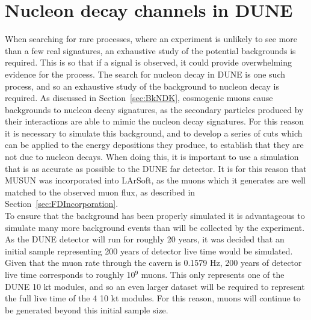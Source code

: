 \section{Nucleon decay channels in DUNE} \label{sec:DUNENDK} %
When searching for rare processes, where an experiment is unlikely to see more than a few real signatures, an exhaustive study of the potential backgrounds is required. This is so that if a signal is observed, it could provide overwhelming evidence for the process. The search for nucleon decay in DUNE is one such process, and so an exhaustive study of the background to nucleon decay is required. As discussed in Section~\ref{sec:BkNDK}, cosmogenic muons cause backgrounds to nucleon decay signatures, as the secondary particles produced by their interactions are able to mimic the nucleon decay signatures. For this reason it is necessary to simulate this background, and to develop a series of cuts which can be applied to the energy depositions they produce, to establish that they are not due to nucleon decays. When doing this, it is important to use a simulation that is as accurate as possible to the DUNE far detector. It is for this reason that MUSUN was incorporated into LArSoft, as the muons which it generates are well matched to the observed muon flux, as described in Section~\ref{sec:FDIncorporation}. \\

To ensure that the background has been properly simulated it is advantageous to simulate many more background events than will be collected by the experiment. As the DUNE detector will run for roughly 20 years, it was decided that an initial sample representing 200 years of detector live time would be simulated. Given that the muon rate through the cavern is 0.1579 Hz, 200 years of detector live time corresponds to roughly 10$^9$ muons. This only represents one of the DUNE 10 kt modules, and so an even larger dataset will be required to represent the full live time of the 4 10 kt modules. For this reason, muons will continue to be generated beyond this initial sample size. \\

